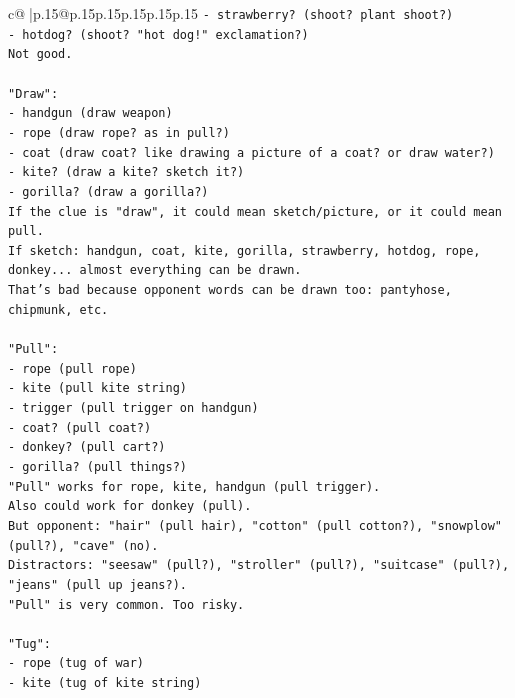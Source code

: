 \documentclass{article}
\begin{document}
{\begin{supertabular}{c@{$\;$}|p{.15\linewidth}@{}p{.15\linewidth}p{.15\linewidth}p{.15\linewidth}p{.15\linewidth}p{.15\linewidth}}
{{{\texttt{{-} strawberry? (shoot? plant shoot?)} \\
\texttt{{-} hotdog? (shoot? "hot dog!" exclamation?)} \\
\texttt{Not good.} \\
\\ 
\texttt{"Draw":} \\
\texttt{{-} handgun (draw weapon)} \\
\texttt{{-} rope (draw rope? as in pull?)} \\
\texttt{{-} coat (draw coat? like drawing a picture of a coat? or draw water?)} \\
\texttt{{-} kite? (draw a kite? sketch it?)} \\
\texttt{{-} gorilla? (draw a gorilla?)} \\
\texttt{If the clue is "draw", it could mean sketch/picture, or it could mean pull.} \\
\texttt{If sketch: handgun, coat, kite, gorilla, strawberry, hotdog, rope, donkey... almost everything can be drawn.} \\
\texttt{That's bad because opponent words can be drawn too: pantyhose, chipmunk, etc.} \\
\\ 
\texttt{"Pull":} \\
\texttt{{-} rope (pull rope)} \\
\texttt{{-} kite (pull kite string)} \\
\texttt{{-} trigger (pull trigger on handgun)} \\
\texttt{{-} coat? (pull coat?)} \\
\texttt{{-} donkey? (pull cart?)} \\
\texttt{{-} gorilla? (pull things?)} \\
\texttt{"Pull" works for rope, kite, handgun (pull trigger).} \\
\texttt{Also could work for donkey (pull).} \\
\texttt{But opponent: "hair" (pull hair), "cotton" (pull cotton?), "snowplow" (pull?), "cave" (no).} \\
\texttt{Distractors: "seesaw" (pull?), "stroller" (pull?), "suitcase" (pull?), "jeans" (pull up jeans?).} \\
\texttt{"Pull" is very common. Too risky.} \\
\\ 
\texttt{"Tug":} \\
\texttt{{-} rope (tug of war)} \\
\texttt{{-} kite (tug of kite string)} \\
}}}
\end{supertabular}}
\end{document}
